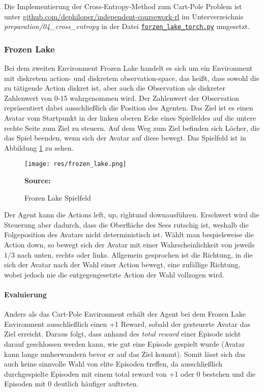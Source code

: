 \documentclass[11pt]{scrartcl}
\newcommand{\source}[1]{\vspace{-5pt} \caption*{\hfill \textbf{Source:} {#1}} }
\begin{document}
Die Implementierung der Cross-Entropy-Method zum Cart-Pole Problem ist unter
\url{github.com/dephiloper/independent-coursework-rl} im Unterverzeichnis 
\textit{preparation/04\_cross\_entropy} in der Datei
\href{https://github.com/dephiloper/independent-coursework-rl/blob/master/preparation/04_cross_entropy/cart_pole_torch.py}{\nolinkurl{forzen\_lake\_torch.py}} umgesetzt.


\subsubsection{Frozen Lake}
\label{sec:frozen-lake}
Bei dem zweiten Environment Frozen Lake handelt es sich um ein Environment mit diskretem action-
und diskretem observation-space, das heißt, dass sowohl die zu tätigende Action diskret ist,
aber auch die Observation als diskreter Zahlenwert von 0-15 wahrgenommen wird. Der Zahlenwert
der Observation repräsentiert dabei ausschließlich die Position des Agenten. Das Ziel ist es
einen Avatar vom Startpunkt in der linken oberen Ecke eines Spielfeldes auf die untere rechte
Seite zum Ziel zu steuern. Auf dem Weg zum Ziel befinden sich Löcher, die das Spiel beenden, wenn
sich der Avatar auf diese bewegt. Das Spielfeld ist in Abbildung \ref{fig:frozen_lake} zu sehen.

\begin{figure}[htp]
\centering
\texttt{[image: res/frozen\_lake.png]}
\caption{Frozen Lake Spielfeld}
\source{\cite[~S.90 - Chapter 4 - Figure 5]{L2018}}
\label{fig:frozen_lake}
\end{figure}

\noindent
Der Agent kann die Actions \grqq left\grqq, \grqq up\grqq, \grqq right\grqq und \grqq
down\grqq ausführen. Erschwert wird die Steuerung aber dadurch, dass die Oberfläche des
Sees rutschig ist, weshalb die Folgeposition des Avatars nicht deterministisch ist.
Wählt man bespielsweise die Action \grqq down\grqq, so bewegt sich der Avatar mit einer
Wahrscheinlichkeit von jeweils $1/3$ nach unten, rechts oder links. Allgemein gesprochen
ist die Richtung, in die sich der Avatar nach der Wahl einer Action bewegt, eine zufällige
Richtung, wobei jedoch nie die entgegengesetzte Action der Wahl vollzogen wird.


\paragraph*{Evaluierung}
\noindent
\newline
Anders als das Cart-Pole Environment erhält der Agent bei dem Frozen Lake Environment 
ausschließlich einen +1 Reward, sobald der gesteuerte Avatar das Ziel erreicht. Daraus folgt,
dass anhand des \textit{total reward} einer Episode nicht darauf geschlossen werden kann,
wie gut eine Episode gespielt wurde (Avatar kann lange umherwandern bevor er auf das Ziel kommt).
Somit lässt sich das auch keine sinnvolle Wahl von elite Episoden treffen, da ausschließlich
durchgespielte Episoden mit einem total reward von +1 oder 0 bestehen und die Episoden mit 0
deutlich häufiger auftreten.
\end{document}
